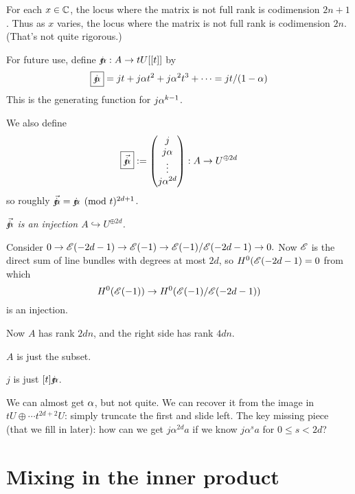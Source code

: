 {For each $x \in \mathbb{C}$, the locus where the matrix is not full rank is codimension $2n+1$.
Thus as $x$ varies, the locus where the matrix is not full rank is codimension $\boxed{\boxed{2n}}$.
(That's not quite rigorous.)


For future use, define $\mathord{j\mkern-7mu\alpha}: A \rightarrow t U[[t]]$ by
$$\boxed{\mathord{j\mkern-7mu\alpha}} = j t + j \alpha  t^2 + j \alpha^2  t^3 + \cdots = jt/(1-\alpha)$$
This is the generating function for $j \alpha^{k-1}$.

We also define
$$
\boxed{\vec{\mathord{j\mkern-7mu\alpha}}} :=
\begin{pmatrix}
j \\
  j \alpha \\
  \vdots \\
j \alpha^{2d}
\end{pmatrix} : A \rightarrow U^{\oplus 2d}
$$
so roughly $\vec{\mathord{j\mkern-7mu\alpha}} = 
\mathord{j\mkern-7mu\alpha} \pmod t^{2d+1}$.

   {\em $\vec{\mathord{j\mkern-7mu\alpha}}$ is an injection $A \hookrightarrow U^{\oplus 2d}$.
}


Consider $0 \rightarrow {\mathscr{E}}(-2d-1) \rightarrow {\mathscr{E}}(-1) \rightarrow {\mathscr{E}}(-1)/{\mathscr{E}}(-2d-1) \rightarrow 0.$
Now ${\mathscr{E}}$ is the direct sum of line bundles with degrees at most $2d$,
so $H^0({\mathscr{E}}(-2d-1)=0$ from which
$$
H^0({\mathscr{E}}(-1)) \rightarrow H^0({\mathscr{E}}(-1)/ {\mathscr{E}}(-2d-1))$$ is an  injection. \epf

Now $A$ has rank $2dn$, and  the right side has rank $4dn$.


$A$ is just the subset.

$j$ is just $[t] \mathord{j\mkern-7mu\alpha}$.

We can almost get $\alpha$, but not quite. We can recover it from the image in
$tU \oplus \cdots t^{2d+2}U$:  simply truncate the first and slide left.
The key missing piece (that we fill in later):  how can we get $j \alpha^{2d} a$ if we know $j \alpha^s a$ for $0 \leq s < 2d$?


\section{Mixing in the inner product}


}
